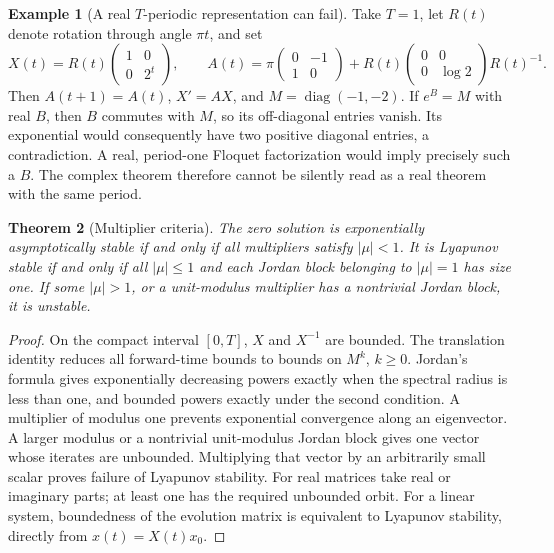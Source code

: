 \documentclass[11pt,oneside]{book}
\newtheorem{theorem}{Theorem}[chapter]
\theoremstyle{definition}
\newtheorem{example}[theorem]{Example}
\theoremstyle{remark}\newtheorem{remark}[theorem]{Remark}
\begin{document}
\begin{example}[A real \(T\)-periodic representation can fail]\label{d13:08:real-log-counterexample}
Take \(T=1\), let \(R(t)\) denote rotation through angle \(\pi t\), and set
\[
 X(t)=R(t)\begin{pmatrix}1&0\\0&2^t\end{pmatrix},\qquad
 A(t)=\pi\begin{pmatrix}0&-1\\1&0\end{pmatrix}
       +R(t)\begin{pmatrix}0&0\\0&\log2\end{pmatrix}R(t)^{-1}.
\]
Then \(A(t+1)=A(t)\), \(X'=AX\), and \(M=\operatorname{diag}(-1,-2)\).
If \(e^B=M\) with real \(B\), then \(B\) commutes with \(M\), so its
off-diagonal entries vanish. Its exponential would consequently have two
positive diagonal entries, a contradiction. A real, period-one Floquet
factorization would imply precisely such a \(B\).
The complex theorem therefore cannot be silently read as a real theorem
with the same period.
\end{example}

\begin{theorem}[Multiplier criteria]\label{d13:08:stability}
The zero solution is exponentially asymptotically stable if and only if all
multipliers satisfy \(|\mu|<1\). It is Lyapunov stable if and only if all
\(|\mu|\le1\) and each Jordan block belonging to \(|\mu|=1\) has size one.
If some \(|\mu|>1\), or a unit-modulus multiplier has a nontrivial Jordan
block, it is unstable.
\end{theorem}
\begin{proof}
On the compact interval \([0,T]\), \(X\) and \(X^{-1}\) are bounded.
The translation identity reduces all forward-time bounds to bounds on
\(M^k\), \(k\ge0\). Jordan's formula gives exponentially decreasing powers
exactly when the spectral radius is less than one, and bounded powers
exactly under the second condition. A multiplier of modulus one prevents
exponential convergence along an eigenvector. A larger modulus or a
nontrivial unit-modulus Jordan block gives one vector whose iterates are
unbounded. Multiplying that vector by an arbitrarily small scalar proves
failure of Lyapunov stability. For real matrices take real or imaginary
parts; at least one has the required unbounded orbit. For a linear system,
boundedness of the evolution matrix is equivalent to Lyapunov stability,
directly from \(x(t)=X(t)x_0\).
\end{proof}
\end{document}
